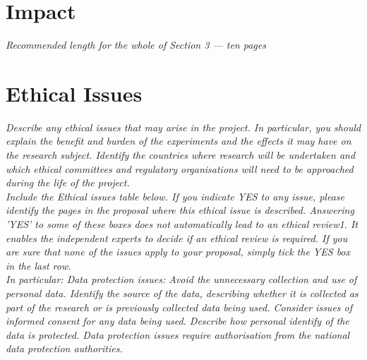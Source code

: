 \documentclass[a4paper,11pt,twoside]{scrreprt}
\newcommand{\commissionhints}[1]{\small \textit{#1}}
\begin{document}



































\chapter{Impact}\label{chap:impact}
\commissionhints{Recommended length for the whole of Section 3 --- ten
  pages}







\chapter{Ethical Issues}\label{chap:ethical}
\commissionhints{ %
  Describe any ethical issues that may arise in the project. In particular, you should
  explain the benefit and burden of the experiments and the effects it may have on the
  research subject. Identify the countries where research will be undertaken and which
  ethical committees and regulatory organisations will need to be approached during the
  life of the project.
\\
  Include the Ethical issues table below.  If you indicate YES to any issue, please
  identify the pages in the proposal where this ethical issue is described. Answering
  'YES' to some of these boxes does not automatically lead to an ethical review1.  It
  enables the independent experts to decide if an ethical review is required. If you are
  sure that none of the issues apply to your proposal, simply tick the YES box in the last
  row.
\\
In particular: Data protection issues: Avoid the unnecessary collection and use of
personal data. Identify the source of the data, describing whether it
is collected as part of the research or is previously collected data
being used. Consider issues of informed consent for any data being
used. Describe how personal identify of the data is protected. Data
protection issues require authorisation from the national data
protection authorities. 
}
\end{document}
